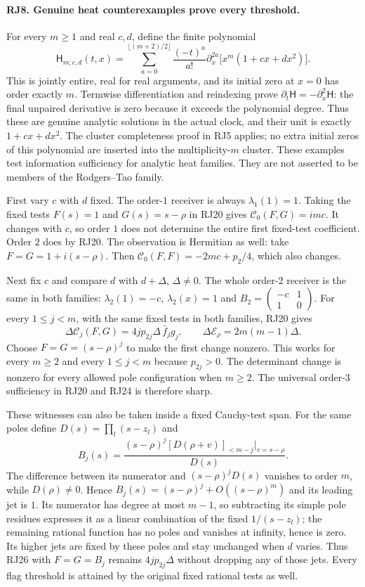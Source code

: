\paragraph{RJ8. Genuine heat counterexamples prove every threshold.}
For every $m\ge1$ and real $c,d$, define the finite polynomial
\[
 \mathsf H_{m;c,d}(t,x)=
 \sum_{a=0}^{\lfloor(m+2)/2\rfloor}
   \frac{(-t)^a}{a!}\partial_x^{2a}
                  \bigl[x^m(1+cx+dx^2)\bigr].
 \tag{RJ25}
\]
This is jointly entire, real for real arguments, and its initial
zero at $x=0$ has order exactly $m$. Termwise differentiation
and reindexing prove $\partial_t\mathsf H=-\partial_x^2\mathsf H$:
the final unpaired derivative is zero because it exceeds the
polynomial degree. Thus these are genuine analytic solutions in
the actual clock, and their unit is exactly $1+cx+dx^2$.
The cluster completeness proof in RJ5 applies; no extra initial
zeros of this polynomial are inserted into the multiplicity-$m$
cluster. These examples test information sufficiency for analytic
heat families. They are not asserted to be members of the
Rodgers--Tao family.

First vary $c$ with $d$ fixed. The order-$1$ receiver is always
$\lambda_1(1)=1$. Taking the fixed tests $F(s)=1$ and
$G(s)=s-\rho$ in RJ20 gives $\mathcal C_0(F,G)=imc$.
It changes with $c$, so order $1$ does not determine the entire
first fixed-test coefficient. Order $2$ does by RJ20. The
observation is Hermitian as well: take $F=G=1+i(s-\rho)$.
Then $\mathcal C_0(F,F)=-2mc+p_2/4$, which also changes.

Next fix $c$ and compare $d$ with $d+\Delta$, $\Delta\ne0$.
The whole order-$2$ receiver is the same in both families:
$\lambda_2(1)=-c$, $\lambda_2(x)=1$ and
$B_2=\left(\begin{smallmatrix}-c&1\\1&0\end{smallmatrix}\right)$.
For every $1\le j<m$, with the same fixed tests in both families,
RJ20 gives
\[
 \boxed{\Delta\mathcal C_j(F,G)=
              4j p_{2j}\Delta\,\bar f_jg_j,\qquad
       \Delta\mathcal E_\rho=2m(m-1)\Delta.}
 \tag{RJ26}
\]
Choose $F=G=(s-\rho)^j$ to make the first change nonzero.
This works for every $m\ge2$ and every $1\le j<m$ because
$p_{2j}>0$. The determinant change is nonzero for every allowed
pole configuration when $m\ge2$. The universal order-$3$
sufficiency in RJ20 and RJ24 is therefore sharp.

These witnesses can also be taken inside a fixed Cauchy-test
span. For the same poles define $D(s)=\prod_l(s-z_l)$ and
\[
 B_j(s)=\frac{(s-\rho)^j
                [D(\rho+v)]_{<m-j}|_{v=s-\rho}}{D(s)}.
 \tag{RJ27}
\]
The difference between its numerator and $(s-\rho)^jD(s)$
vanishes to order $m$, while $D(\rho)\ne0$. Hence
$B_j(s)=(s-\rho)^j+O((s-\rho)^m)$ and its leading jet is $1$.
Its numerator has degree at most $m-1$, so subtracting its simple
pole residues expresses it as a linear combination of the fixed
$1/(s-z_l)$; the remaining rational function has no poles and
vanishes at infinity, hence is zero. Its higher jets are fixed
by these poles and stay unchanged when $d$ varies. Thus RJ26
with $F=G=B_j$ remains $4j p_{2j}\Delta$ without dropping any
of those jets. Every flag threshold is attained by the original
fixed rational tests as well.

